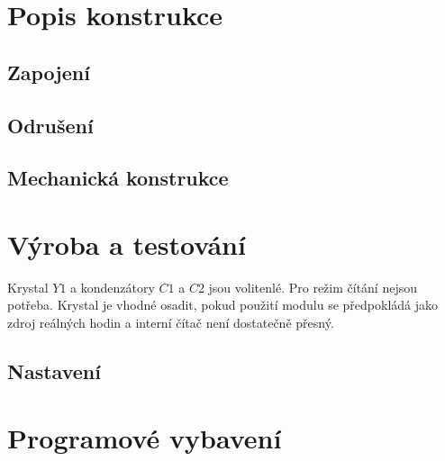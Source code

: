 \documentclass[12pt,a4paper,final,titlepage,twoside]{article}
\begin{document}



\section{Popis konstrukce}

\subsection{Zapojení}


\subsection{Odrušení}

\subsection{Mechanická konstrukce}

\section{Výroba a testování}



Krystal $Y1$ a kondenzátory $C1$ a $C2$ jsou volitenlé. Pro režim čítání nejsou potřeba. Krystal je vhodné osadit, pokud použití modulu se předpokládá jako zdroj reálných hodin a interní čítač není dostatečně přesný.
\subsection{Nastavení}

\section{Programové vybavení}
\end{document}

